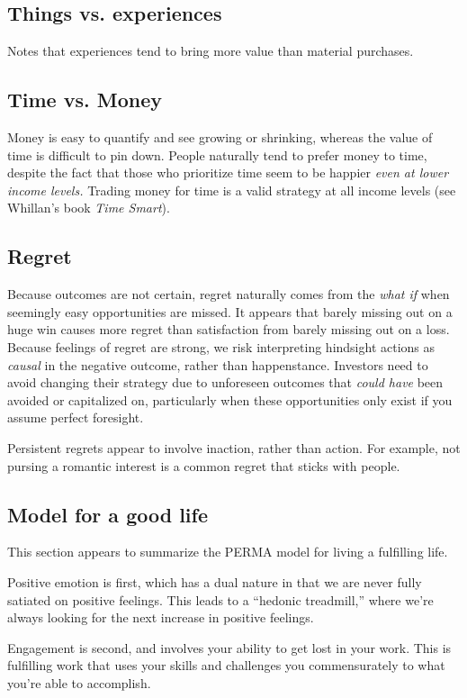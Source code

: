 \documentclass{article}
\begin{document}
\subsection{Things vs. experiences}
Notes that experiences tend to bring more value than material purchases.

\subsection{Time vs. Money}
Money is easy to quantify and see growing or shrinking, whereas the value of time is difficult to pin down.  People naturally tend to prefer money to time, despite the fact that those who prioritize time seem to be happier {\it even at lower income levels.}  Trading money for time is a valid strategy at all income levels (see Whillan's book {\it Time Smart}).

\subsection{Regret}
Because outcomes are not certain, regret naturally comes from the {\it what if} when seemingly easy opportunities are missed.  It appears that barely missing out on a huge win causes more regret than satisfaction from barely missing out on a loss.  Because feelings of regret are strong, we risk interpreting hindsight actions as {\it causal} in the negative outcome, rather than happenstance.  Investors need to avoid changing their strategy due to unforeseen outcomes that {\it could have} been avoided or capitalized on, particularly when these opportunities only exist if you assume perfect foresight.

Persistent regrets appear to involve inaction, rather than action.  For example, not pursing a romantic interest is a common regret that sticks with people.

\subsection{Model for a good life}
This section appears to summarize the PERMA model for living a fulfilling life.

Positive emotion is first, which has a dual nature in that we are never fully satiated on positive feelings.  This leads to a ``hedonic treadmill,'' where we're always looking for the next increase in positive feelings.

Engagement is second, and involves your ability to get lost in your work.  This is fulfilling work that uses your skills and challenges you commensurately to what you're able to accomplish.
\end{document}
